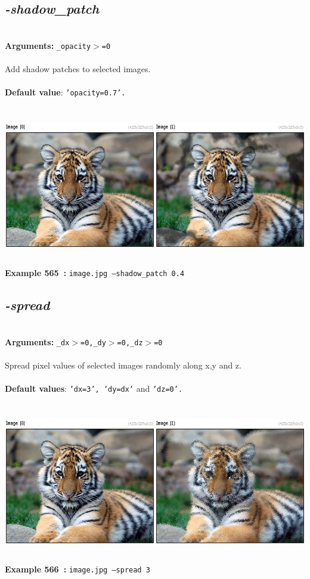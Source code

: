 \documentclass[a4paper,11pt,twoside]{book}
\begin{document}
\subsection{\emph{-shadow\_patch} }\vspace*{-0.5em}
~\\\textbf{Arguments: } 
{\small \texttt{\_opacity$>$=0}}\\~\\
Add shadow patches to selected images.
~\\~\\\textbf{Default value}: {\small \texttt{'opacity=0.7'.}}
\begin{center}\includegraphics[keepaspectratio=true,height=7cm,width=\textwidth]{img/gmic_def565.jpg}\\
{\footnotesize \textbf{Example 565~:} \texttt{image.jpg --shadow\_patch 0.4}}
\end{center}

\subsection{\emph{-spread} }\vspace*{-0.5em}
~\\\textbf{Arguments: } 
{\small \texttt{\_dx$>$=0,\_dy$>$=0,\_dz$>$=0}}\\~\\
Spread pixel values of selected images randomly along x,y and z.
~\\~\\\textbf{Default values}: {\small \texttt{'dx=3', 'dy=dx'} and \texttt{'dz=0'.}}
\begin{center}\includegraphics[keepaspectratio=true,height=7cm,width=\textwidth]{img/gmic_def566.jpg}\\
{\footnotesize \textbf{Example 566~:} \texttt{image.jpg --spread 3}}
\end{center}
\end{document}
